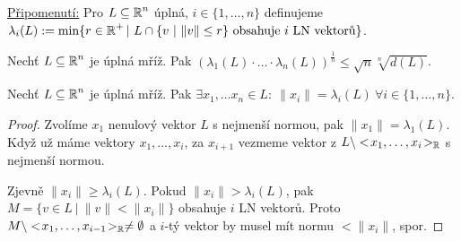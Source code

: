 \underline{Připomenutí:} Pro $L \subseteq \operatorname{\mathbb{R}}^n$ úplná, $i \in \{1,\dots,n\}$ definujeme\\ $\lambda_i(L) := \min\{r \in \operatorname{\mathbb{R}}^+ | \ L \cap \{v \ | \ \|v\| \leq r\} \text{ obsahuje }i\text{ LN vektorů}\}$.

\begin{theorem}[Minkowski]\label{theorem_minkowski}
Nechť $L \subseteq \operatorname{\mathbb{R}}^n$ je úplná mříž. Pak $(\lambda_1(L)\cdot\ldots\cdot\lambda_n(L))^{\frac{1}{n}} \leq \sqrt{n}\sqrt[n]{d(L)}$.
\end{theorem}

\begin{lemma}\label{lemma_pred_minkowski}
Nechť $L \subseteq \operatorname{\mathbb{R}}^n$ je úplná mříž. Pak $\exists x_1, \dots x_n \in L: \ \|x_i\| = \lambda_i(L) \ \forall i \in \{1,\dots,n\}$.
\end{lemma}
\begin{proof}
Zvolíme $x_1$ nenulový vektor $L$ s nejmenší normou, pak $\|x_1\|=\lambda_1(L)$. Když už máme vektory $x_1,\dots,x_i$, za $x_{i+1}$ vezmeme vektor z $L\setminus <\!x_1,\ldots,x_i\!>_{\operatorname{\mathbb{R}}}$ s nejmenší normou. 

Zjevně $\|x_i\|\geq\lambda_i(L)$. Pokud $\|x_i\|>\lambda_i(L)$, pak $M=\{v\in L \ | \ \|v\|<\|x_i\| \}$ obsahuje $i$ LN vektorů. Proto $M\setminus <\!x_1,\ldots,x_{i-1}\!>_{\operatorname{\mathbb{R}}} \neq\emptyset$ a $i$-tý vektor by musel mít normu $<\|x_i\|$, spor.
\end{proof}

